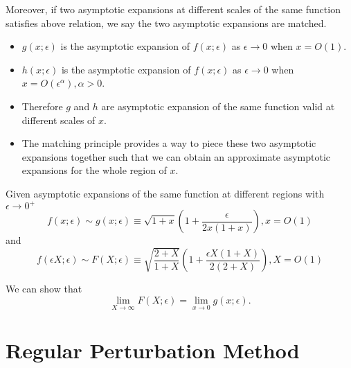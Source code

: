 \begin{refsection}
\begin{definition}
Moreover, if two asymptotic expansions at different scales of the same function satisfies above relation, we say the two asymptotic expansions are matched. 
\end{definition}
\begin{remark}[interpretation]\hfill
\begin{itemize}
	\item $g(x;\epsilon)$ is the asymptotic expansion of $f(x;\epsilon)$ as $\epsilon \to 0$ when $x = O(1)$.
	\item $h(x;\epsilon)$ is the asymptotic expansion of $f(x;\epsilon)$ as $\epsilon \to 0$ when $x = O(\epsilon^\alpha),\alpha >0$.
	\item Therefore $g$ and $h$ are asymptotic expansion of the same function valid at different scales of $x$. 
	\item The matching principle provides a way to piece these two asymptotic expansions together such that we can obtain an approximate asymptotic expansions for the whole region of $x$.    
\end{itemize}
\end{remark}




\begin{example}
	Given asymptotic expansions of the same function at different regions with $\epsilon \to 0^+$
	$$f(x;\epsilon) \sim g(x;\epsilon) \equiv \sqrt{1+x}(1 + \frac{\epsilon}{2x(1+x)}), x = O(1)$$
	and
	$$f(\epsilon X;\epsilon) \sim  F(X;\epsilon)\equiv \sqrt{\frac{2+X}{1+X}}(1 + \frac{\epsilon X(1+X)}{2(2+X)}), X=O(1)$$
	
	We can show that
	$$\lim_{X\to \infty} F(X;\epsilon) = \lim_{x\to 0} g(x;\epsilon) .$$
\end{example}

\section{Regular Perturbation Method}



\end{refsection}
